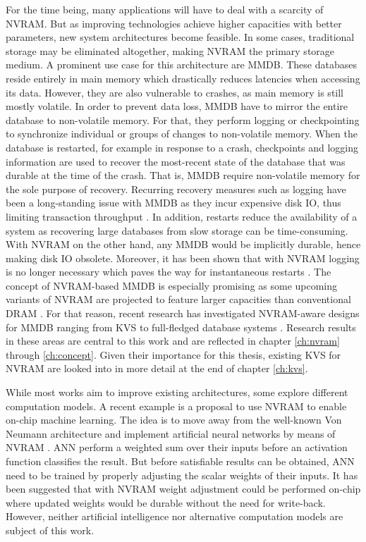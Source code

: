 For the time being, many applications will have to deal with a scarcity of
NVRAM. But as improving technologies achieve higher capacities with better
parameters, new system architectures become feasible. In some cases, traditional
storage may be eliminated altogether, making NVRAM the primary storage medium. A
prominent use case for this architecture are MMDB. These databases reside
entirely in main memory which drastically reduces latencies when accessing its
data. However, they are also vulnerable to crashes, as main memory is still
mostly volatile. In order to prevent data loss, MMDB have to mirror the entire
database to non-volatile memory. For that, they perform logging or checkpointing
to synchronize individual or groups of changes to non-volatile memory. When the
database is restarted, for example in response to a crash, checkpoints and
logging information are used to recover the most-recent state of the database
that was durable at the time of the crash. That is, MMDB require non-volatile
memory for the sole purpose of recovery. Recurring recovery measures such as
logging have been a long-standing issue with MMDB as they incur expensive disk
IO, thus limiting transaction throughput \cite{eich1986main, molina1992main,
wust2012efficient, malviya2014rethinking}. In addition, restarts reduce the
availability of a system as recovering large databases from slow storage can be
time-consuming. With NVRAM on the other hand, any MMDB would be implicitly
durable, hence making disk IO obsolete. Moreover, it has been shown that with
NVRAM logging is no longer necessary which paves the way for instantaneous
restarts \cite{oukid2015instant}. The concept of NVRAM-based MMDB is especially
promising as some upcoming variants of NVRAM are projected to feature larger
capacities than conventional DRAM \cite{lee2009architecting,
zilberberg2013phase, dulloor2014system}. For that reason, recent research has
investigated NVRAM-aware designs for MMDB ranging from KVS
\cite{bailey2013exploring, zhou2016nvht, wu2016nvmcached} to full-fledged
database systems \cite{oukid2015instant, schwalb2016hyrise, andrei2017sap}.
Research results in these areas are central to this work and are reflected in
chapter \ref{ch:nvram} through \ref{ch:concept}. Given their importance for this
thesis, existing KVS for NVRAM are looked into in more detail at the end of
chapter \ref{ch:kvs}.

While most works aim to improve existing architectures, some explore different
computation models. A recent example is a proposal to use NVRAM to enable
on-chip machine learning. The idea is to move away from the well-known Von
Neumann architecture and implement artificial neural networks by means of NVRAM
\cite{fumarola2016accelerating}. ANN perform a weighted sum over their inputs
before an activation function classifies the result. But before satisfiable
results can be obtained, ANN need to be trained by properly adjusting the scalar
weights of their inputs. It has been suggested that with NVRAM weight adjustment
could be performed on-chip where updated weights would be durable without the
need for write-back. However, neither artificial intelligence nor alternative
computation models are subject of this work.

